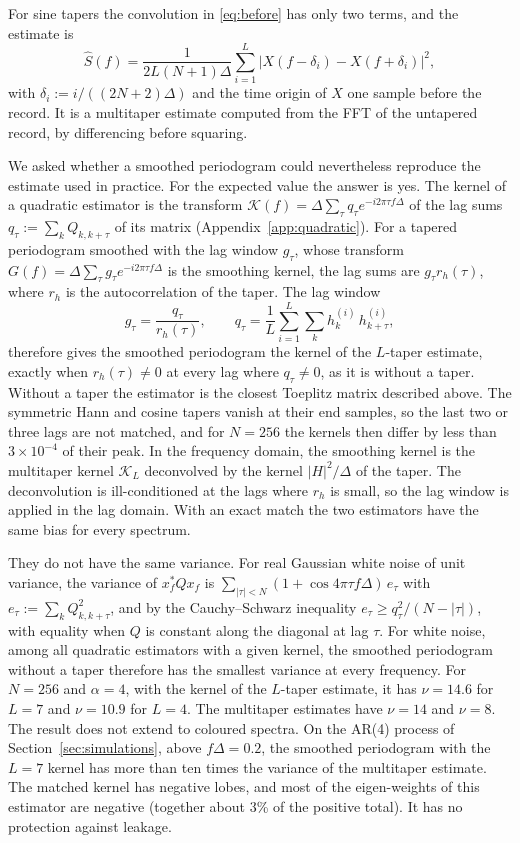\documentclass[10pt,twocolumn]{article}
\begin{document}
For sine tapers \cite{riedel1995} the convolution in \eqref{eq:before} has only two terms, and the estimate is
\begin{equation}
\hat S(f)=\frac{1}{2L(N+1)\Delta}\sum_{i=1}^{L}\bigl|X(f-\delta_i)-X(f+\delta_i)\bigr|^2,
\label{eq:sinefft}
\end{equation}
with $\delta_i:=i/((2N+2)\Delta)$ and the time origin of $X$ one sample before the record. It is a multitaper estimate computed from the FFT of the untapered record, by differencing before squaring.

We asked whether a smoothed periodogram could nevertheless reproduce the estimate used in practice. For the expected value the answer is yes. The kernel of a quadratic estimator is the transform $\mathcal{K}(f)=\Delta\sum_\tau q_\tau e^{-i2\pi\tau f\Delta}$ of the lag sums $q_\tau:=\sum_kQ_{k,k+\tau}$ of its matrix (Appendix~\ref{app:quadratic}). For a tapered periodogram smoothed with the lag window $g_\tau$, whose transform $G(f)=\Delta\sum_\tau g_\tau e^{-i2\pi\tau f\Delta}$ is the smoothing kernel, the lag sums are $g_\tau r_h(\tau)$, where $r_h$ is the autocorrelation of the taper. The lag window
\begin{equation}
g_\tau=\frac{q_\tau}{r_h(\tau)},\qquad q_\tau=\frac1L\sum_{i=1}^{L}\sum_kh^{(i)}_k\,h^{(i)}_{k+\tau},
\label{eq:matched}
\end{equation}
therefore gives the smoothed periodogram the kernel of the $L$-taper estimate, exactly when $r_h(\tau)\neq0$ at every lag where $q_\tau\neq0$, as it is without a taper. Without a taper the estimator is the closest Toeplitz matrix described above. The symmetric Hann and cosine tapers vanish at their end samples, so the last two or three lags are not matched, and for $N=256$ the kernels then differ by less than $3\times10^{-4}$ of their peak. In the frequency domain, the smoothing kernel is the multitaper kernel $\mathcal{K}_L$ deconvolved by the kernel $|H|^2/\Delta$ of the taper. The deconvolution is ill-conditioned at the lags where $r_h$ is small, so the lag window is applied in the lag domain. With an exact match the two estimators have the same bias for every spectrum.

They do not have the same variance. For real Gaussian white noise of unit variance, the variance of $x_f^{*}Qx_f$ is $\sum_{|\tau|<N}(1+\cos4\pi\tau f\Delta)\,e_\tau$ with $e_\tau:=\sum_kQ_{k,k+\tau}^2$, and by the Cauchy--Schwarz inequality $e_\tau\ge q_\tau^2/(N-|\tau|)$, with equality when $Q$ is constant along the diagonal at lag $\tau$. For white noise, among all quadratic estimators with a given kernel, the smoothed periodogram without a taper therefore has the smallest variance at every frequency. For $N=256$ and $\alpha=4$, with the kernel of the $L$-taper estimate, it has $\nu=14.6$ for $L=7$ and $\nu=10.9$ for $L=4$. The multitaper estimates have $\nu=14$ and $\nu=8$. The result does not extend to coloured spectra. On the AR(4) process of Section~\ref{sec:simulations}, above $f\Delta=0.2$, the smoothed periodogram with the $L=7$ kernel has more than ten times the variance of the multitaper estimate. The matched kernel has negative lobes, and most of the eigen-weights of this estimator are negative (together about 3\% of the positive total). It has no protection against leakage.
\end{document}
